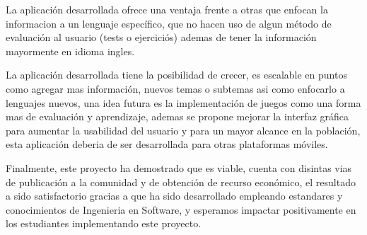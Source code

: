 La aplicación desarrollada ofrece una ventaja frente a otras que enfocan la informacion a un lenguaje específico, que no hacen uso de algun método de evaluación al usuario (tests o ejerciciós) ademas de tener la información mayormente en idioma ingles.\\\newline

La aplicación desarrollada tiene la posibilidad de crecer, es escalable en puntos como agregar mas información, nuevos temas o subtemas asi como enfocarlo a lenguajes nuevos, una idea futura es la implementación de juegos como una forma mas de evaluación y aprendizaje, ademas se propone mejorar la interfaz gráfica para aumentar la usabilidad del usuario y para un mayor alcance en la población, esta aplicación deberia de ser desarrollada para otras plataformas móviles.\\\newline

Finalmente, este proyecto ha demostrado que es viable, cuenta con disintas vias de publicación a la comunidad y de obtención de recurso económico, el resultado a sido satisfactorio gracias a que ha sido desarrollado empleando estandares y conocimientos de Ingenieria en Software, y esperamos impactar positivamente en los estudiantes implementando este proyecto.